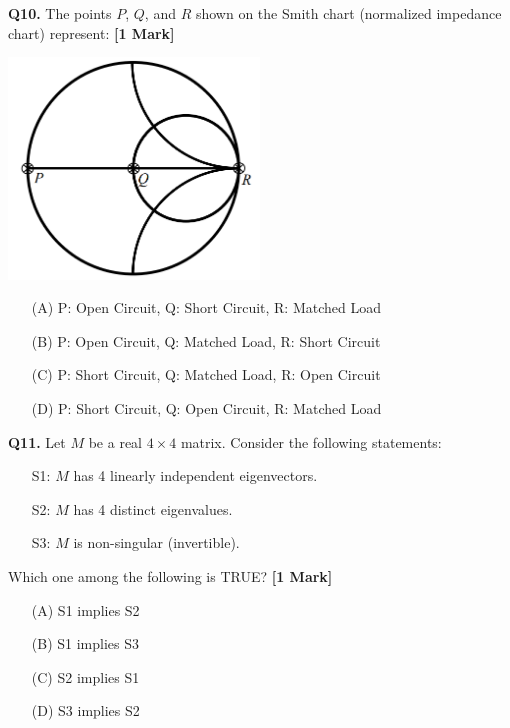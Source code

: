 \documentclass[11pt]{article}
\newcommand{\questiona}[2]{
    \noindent\textbf{Q#2.} #1 \hfill \textbf{[1 Mark]}
}
\begin{document}
\vspace{0.5cm}

\questiona{The points $P$, $Q$, and $R$ shown on the Smith chart (normalized impedance chart) represent:}{10}
\begin{center}
\includegraphics[width=0.5\textwidth]{figures/10.png}
\end{center}
\begin{enumerate}
    \item[(A)] P: Open Circuit, Q: Short Circuit, R: Matched Load
    \item[(B)] P: Open Circuit, Q: Matched Load, R: Short Circuit
    \item[(C)] P: Short Circuit, Q: Matched Load, R: Open Circuit
    \item[(D)] P: Short Circuit, Q: Open Circuit, R: Matched Load
\end{enumerate}

\vspace{0.5cm}

\questiona{Let $M$ be a real $4 \times 4$ matrix. Consider the following statements:
\begin{enumerate}
     \item[S1:] $M$ has 4 linearly independent eigenvectors.
     \item[S2:] $M$ has 4 distinct eigenvalues.
     \item[S3:] $M$ is non-singular (invertible).
\end{enumerate}

Which one among the following is TRUE?}{11}
\begin{enumerate}
    \item[(A)] S1 implies S2
    \item[(B)] S1 implies S3
    \item[(C)] S2 implies S1
    \item[(D)] S3 implies S2
\end{enumerate}
\end{document}
